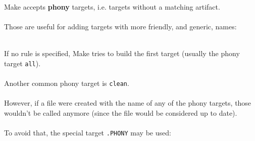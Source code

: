 
\begin{frame}{\secname}
    Make accepts \textbf{phony} targets, i.e. targets without a matching artifact. \\~\\

    Those are useful for adding targets with more friendly, and generic, names: \\~\\

    \makeTarget

\end{frame}


\begin{frame}{\secname}
    If no rule is specified, Make tries to build the first target (usually the phony target \texttt{all}). \\~\\

    Another common phony target is \texttt{clean}. \\~\\

    However, if a file were created with the name of any of the phony targets, those wouldn't be called anymore (since the file would be considered up to date). \\~\\

    To avoid that, the special target \texttt{.PHONY} may be used: \\~\\

    \makePhony

\end{frame}
